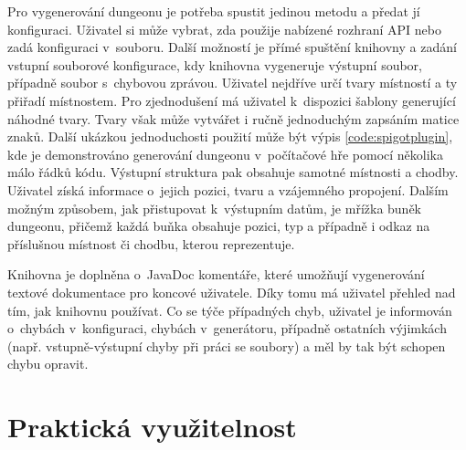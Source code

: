 Pro vygenerování dungeonu je potřeba spustit jedinou metodu a předat jí konfiguraci.
Uživatel si může vybrat, zda použije nabízené rozhraní API nebo zadá konfiguraci v~souboru.
Další možností je přímé spuštění knihovny a zadání vstupní souborové konfigurace, kdy knihovna vygeneruje výstupní soubor, případně soubor s~chybovou zprávou.
Uživatel nejdříve určí tvary místností a ty přiřadí místnostem.
Pro zjednodušení má uživatel k~dispozici šablony generující náhodné tvary.
Tvary však může vytvářet i ručně jednoduchým zapsáním matice znaků.
Další ukázkou jednoduchosti použití může být výpis \ref{code:spigotplugin}, kde je demonstrováno generování dungeonu v~počítačové hře pomocí několika málo řádků kódu.
Výstupní struktura pak obsahuje samotné místnosti a chodby.
Uživatel získá informace o~jejich pozici, tvaru a vzájemného propojení.
Dalším možným způsobem, jak přistupovat k~výstupním datům, je mřížka buněk dungeonu, přičemž každá buňka obsahuje pozici, typ a případně i odkaz na příslušnou místnost či chodbu, kterou reprezentuje.
\par
Knihovna je doplněna o~JavaDoc komentáře, které umožňují vygenerování textové dokumentace pro koncové uživatele.
Díky tomu má uživatel přehled nad tím, jak knihovnu používat.
Co se týče případných chyb, uživatel je informován o~chybách v~konfiguraci, chybách v~generátoru, případně ostatních výjimkách (např. vstupně-výstupní chyby při práci se soubory) a měl by tak být schopen chybu opravit.


\section{Praktická využitelnost}


